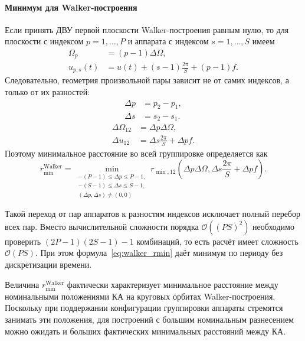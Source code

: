 \paragraph{Минимум для Walker-построения}

Если принять ДВУ первой плоскости Walker-построения равным нулю, то для плоскости с индексом $p=1,\ldots,P$ и аппарата с индексом
$s=1,\ldots,S$ имеем
\begin{equation}
\begin{aligned}
    \Omega_p&=(p-1)\Delta\Omega,\\
    u_{p,s}(t)&=u(t)+(s-1)\frac{2\pi}{S}+(p-1)f.
\end{aligned}
\end{equation}
Следовательно, геометрия произвольной пары зависит не от самих индексов, а
только от их разностей:
\begin{equation}
\begin{aligned}
    \Delta p&=p_2-p_1,\\
    \Delta s&=s_2-s_1.
\end{aligned}
\end{equation}
\begin{equation}
\begin{aligned}
    \Delta\Omega_{12}&=\Delta p\Delta\Omega,\\
    \Delta u_{12}&=\Delta s\frac{2\pi}{S}+\Delta p f.
\end{aligned}
\end{equation}
Поэтому минимальное расстояние во всей группировке определяется как
\begin{equation}
\label{eq:walker_rmin}
    r_{\min}^{\mathrm{Walker}}=
    \min_{\substack{
        -(P-1)\leq\Delta p\leq P-1,\\
        -(S-1)\leq\Delta s\leq S-1,\\
        (\Delta p,\Delta s)\neq(0,0)}}
    r_{\min,12}\left(
        \Delta p\Delta\Omega,
        \Delta s\frac{2\pi}{S}+\Delta p f
    \right).
\end{equation}

Такой переход от пар аппаратов к разностям индексов исключает полный перебор всех пар. Вместо вычислительной сложности порядка $\mathcal{O}((PS)^2)$ необходимо проверить $(2P-1)(2S-1)-1$ комбинаций, то есть расчёт имеет сложность $\mathcal{O}(PS)$. При этом формула~\eqref{eq:walker_rmin} даёт минимум по периоду без дискретизации времени.

Величина $r_{\min}^{\mathrm{Walker}}$ фактически характеризует минимальное расстояние
между номинальными положениями КА на круговых орбитах Walker-построения.
Поскольку при поддержании конфигурации группировки аппараты стремятся
занимать эти положения, для построений с большим номинальным разнесением
можно ожидать и больших фактических минимальных расстояний между КА.
